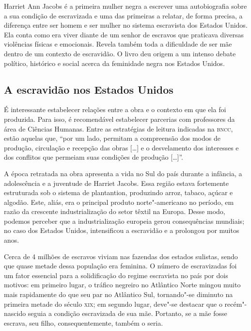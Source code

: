 \documentclass[11pt]{extarticle}
\begin{document}


Harriet Ann Jacobs é a primeira mulher negra a escrever uma
autobiografia sobre a sua condição de escravizada e uma das primeiras a
relatar, de forma precisa, a diferença entre ser homem e ser mulher no
sistema escravista dos Estados Unidos. Ela conta como era viver diante
de um senhor de escravos que praticava diversas violências físicas e
emocionais. Revela também toda a dificuldade de ser mãe dentro de um
contexto de escravidão. O livro deu origem a um intenso debate político,
histórico e social acerca da feminidade negra nos Estados Unidos.

\subsection{A escravidão nos Estados Unidos}

É interessante estabelecer relações entre a obra e o contexto em que ela
foi produzida. Para isso, é recomendável estabelecer parcerias com
professores da área de Ciências Humanas. Entre as estratégias de leitura
indicadas na \textsc{bncc}, estão aquelas que, ``por um lado, permitam a
compreensão dos modos de produção, circulação e recepção das obras
{[}\ldots{}{]} e o desvelamento dos interesses e dos conflitos que permeiam
suas condições de produção {[}\ldots{}{]}''.

A época retratada na obra apresenta a vida no Sul do país durante a
infância, a adolescência e a juventude de Harriet Jacobs. Essa região
estava fortemente estruturada sob o sistema de plantantion, produzindo
arroz, tabaco, açúcar e algodão. Este, aliás, era o principal produto
norte"-americano no período, em razão da crescente industrialização do
setor têxtil na Europa. Desse modo, podemos perceber que a
industrialização europeia gerou consequências mundiais; no caso dos
Estados Unidos, intensificou a escravidão e a prolongou por muitos anos.

Cerca de 4 milhões de escravos viviam nas fazendas dos estados sulistas,
sendo que quase metade dessa população era feminina. O número de
escravizadas foi um fator essencial para a solidificação do regime
escravista no país por dois motivos: em primeiro lugar, o tráfico
negreiro no Atlântico Norte mingou muito mais rapidamente do que seu par
no Atlântico Sul, tornando"-se diminuto na primeira metade do século \textsc{xix};
em segundo lugar, deve"-se destacar que o recém"-nascido seguia a condição
escravizada de sua mãe. Portanto, se a mãe fosse escrava, seu filho,
consequentemente, também o seria.
\end{document}
